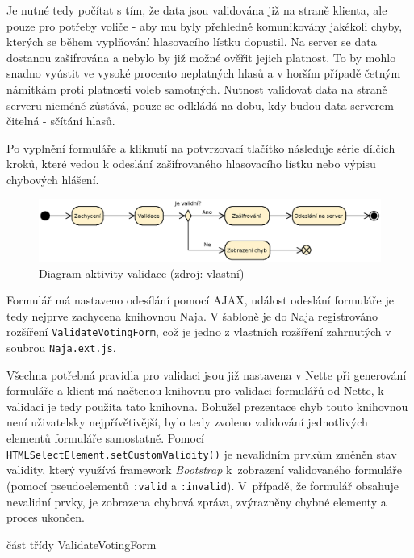 Je nutné tedy počítat s tím, že data jsou validována již na straně klienta, ale pouze pro potřeby voliče - aby mu byly přehledně komunikovány jakékoli chyby, kterých se během vyplňování hlasovacího lístku dopustil. Na server se data dostanou zašifrována a nebylo by již možné ověřit jejich platnost. To by mohlo snadno vyústit ve vysoké procento neplatných hlasů a v horším případě četným námitkám proti platnosti voleb samotných. Nutnost validovat data na straně serveru nicméně zůstává, pouze se odkládá na dobu, kdy budou data serverem čitelná - sčítání hlasů.

Po vyplnění formuláře a kliknutí na potvrzovací tlačítko následuje série dílčích kroků, které vedou k odeslání zašifrovaného hlasovacího lístku nebo výpisu chybových hlášení.

\begin{figure}[h]
	\centering
	\includegraphics[width=\linewidth]{svg/validace.eps}
	\captionsetup{width=\linewidth}
	\caption[Diagram aktivity validace]{Diagram aktivity validace (zdroj: vlastní)}
	\label{fig:diagramValidace}
\end{figure}

Formulář má nastaveno odesílání pomocí AJAX, událost odeslání formuláře je tedy nejprve zachycena knihovnou Naja. V šabloně je do Naja registrováno rozšíření \texttt{ValidateVotingForm}, což je jedno z vlastních rozšíření zahrnutých v soubrou \texttt{Naja.ext.js}.

Všechna potřebná pravidla pro validaci jsou již nastavena v Nette při generování formuláře a klient má načtenou knihovnu pro validaci formulářů od Nette, k validaci je tedy použita tato knihovna. Bohužel prezentace chyb touto knihovnou není uživatelsky nejpřívětivější, bylo tedy zvoleno validování jednotlivých elementů formuláře samostatně. Pomocí \texttt{HTMLSelectElement.setCustomValidity()} je nevalidním prvkům změněn stav validity, který využívá framework \textit{Bootstrap} \cite{Bootstrap} k~zobrazení validovaného formuláře (pomocí pseudoelementů \texttt{:valid} a \texttt{:invalid}). V~případě, že formulář obsahuje nevalidní prvky, je zobrazena chybová zpráva, zvýrazněny chybné elementy a proces ukončen.

\begin{listing}[ht]
\caption{část třídy ValidateVotingForm}
\label{php:validace}
\end{listing}

